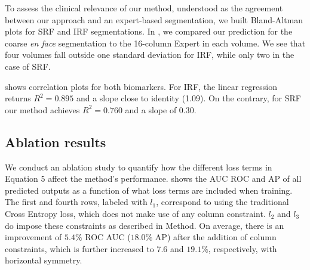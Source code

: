 

To assess the clinical relevance of our method, understood as the agreement between our approach and an expert-based segmentation, we built Bland-Altman plots for SRF and IRF segmentations. In , we compared our prediction for the coarse \textit{en face} segmentation to the 16-column Expert in each volume. We see that four volumes fall outside one standard deviation for IRF, while only two in the case of SRF.



 shows correlation plots for both biomarkers. For IRF, the linear regression returns $R^2=0.895$ and a slope close to identity (1.09). On the contrary, for SRF our method achieves $R^2=0.760$ and a slope of $0.30$.

\subsection{Ablation results}
We conduct an ablation study to quantify how the different loss terms in Equation 5 affect the method's performance.  shows the AUC ROC and AP of all predicted outputs as a function of what loss terms are included when training. The first and fourth rows, labeled with $l_1$, correspond to using the traditional Cross Entropy loss, which does not make use of any column constraint. $l_2$ and $l_3$ do impose these constraints as described in Method. On average, there is an improvement of $5.4\%$ ROC AUC ($18.0\%$ AP) after the addition of column constraints, which is further increased to $7.6$ and $19.1\%$, respectively, with horizontal symmetry.

